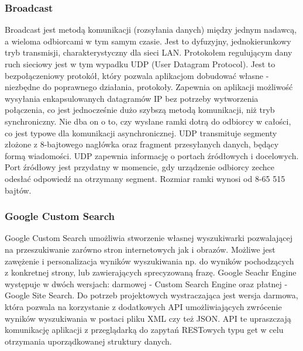 \documentclass[twoside,a4paper]{book}
\begin{document}
\subsubsection{Broadcast}
Broadcast jest metodą komunikacji (rozsyłania danych) między jednym nadawcą, a wieloma odbiorcami w tym samym czasie. Jest to dyfuzyjny, jednokierunkowy tryb  transmisji, charakterystyczny dla sieci LAN. Protokołem regulującym dany ruch sieciowy jest w tym wypadku UDP (User Datagram Protocol). Jest to bezpołączeniowy protokół, który pozwala aplikacjom dobudować własne - niezbędne do poprawnego działania, protokoły. 
Zapewnia on aplikacji możliwość wysyłania enkapsulowanych datagramów IP bez potrzeby wytworzenia połączenia, co jest jednocześnie dużo szybszą metodą komunikacji, niż tryb synchroniczny. Nie dba on o to, czy wysłane ramki dotrą do odbiorcy w całości, co jest typowe dla komunikacji asynchronicznej.
UDP transmituje segmenty złożone z 8-bajtowego nagłówka oraz fragment przesyłanych danych, będący formą wiadomości. 
UDP zapewnia informację o portach źródłowych i docelowych. 
Port źródłowy jest przydatny w momencie, gdy urządzenie odbiorcy zechce odesłać odpowiedź na otrzymany segment.
Rozmiar ramki wynosi od 8-65 515 bajtów. ~\cite{UDP}
\subsubsection{Google Custom Search}
\label{sec:customSearch}
Google Custom Search umożliwia stworzenie własnej wyszukiwarki pozwalającej na przeszukiwanie zarówno stron internetowych jak i obrazów. Możliwe jest zawężenie i personalizacja wyników wyszukiwania np. do wyników pochodzących z konkretnej strony, lub zawierających sprecyzowaną frazę.  Google Seachr Engine występuje w dwóch wersjach: darmowej - Custom Search Engine oraz płatnej - Google Site Search. Do potrzeb projektowych wystraczająca jest wersja darmowa, która pozwala na korzystanie z dodatkowych API umożliwiających zwrócenie wyników wyszukiwania w postaci pliku XML czy też JSON. API te upraszczają komunikację aplikacji z przeglądarką do zapytań RESTowych typu get w celu otrzymania uporządkowanej struktury danych. ~\cite{googleAPI}


 
\end{document}
